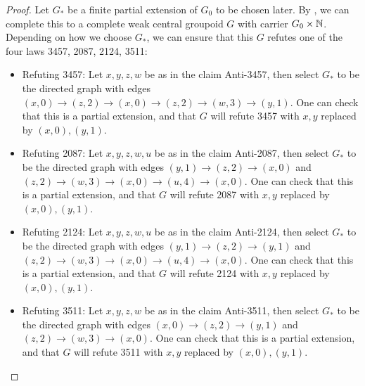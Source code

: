 \begin{proof}
Let $G_*$ be a finite partial extension of $G_0$ to be chosen later.  By , we can complete this to a complete weak central groupoid $G$ with carrier $G_0 \times \mathbb{N}$.  Depending on how we choose $G_*$, we can ensure that this $G$ refutes one of the four laws 3457, 2087, 2124, 3511:
\begin{itemize}
  \item Refuting 3457: Let $x,y,z,w$ be as in the claim Anti-3457, then select $G_*$ to be the directed graph with edges $(x,0) \to (z,2) \to (x,0) \to (z,2) \to (w,3) \to (y,1)$.  One can check that this is a partial extension, and that $G$ will refute 3457 with $x,y$ replaced by $(x,0),(y,1)$.
  \item Refuting 2087: Let $x,y,z,w,u$ be as in the claim Anti-2087, then select $G_*$ to be the directed graph with edges $(y,1) \to (z,2) \to (x,0)$ and $(z,2) \to (w,3) \to (x,0) \to (u,4) \to (x,0)$.  One can check that this is a partial extension, and that $G$ will refute 2087 with $x,y$ replaced by $(x,0),(y,1)$.
  \item Refuting 2124: Let $x,y,z,w,u$ be as in the claim Anti-2124, then select $G_*$ to be the directed graph with edges $(y,1) \to (z,2) \to (y,1)$ and $(z,2) \to (w,3) \to (x,0) \to (u,4) \to (x,0)$.  One can check that this is a partial extension, and that $G$ will refute 2124 with $x,y$ replaced by $(x,0),(y,1)$.
  \item Refuting 3511: Let $x,y,z,w$ be as in the claim Anti-3511, then select $G_*$ to be the directed graph with edges $(x,0) \to (z,2) \to (y,1)$ and $(z,2) \to (w,3) \to (x,0)$.  One can check that this is a partial extension, and that $G$ will refute 3511 with $x,y$ replaced by $(x,0),(y,1)$.
\end{itemize}
\end{proof}

